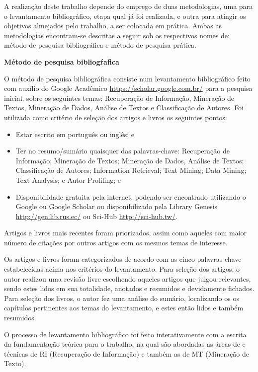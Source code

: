 A realização deste trabalho depende do emprego de duas metodologias, uma para o levantamento bibliográfico, etapa qual já foi realizada, e outra para atingir os objetivos almejados pelo trabalho, a ser colocada em prática.
Ambas as metodologias encontram-se descritas a seguir sob os respectivos nomes de: método de pesquisa bibliográfica e método de pesquisa prática.

\textbf{Método de pesquisa bibliogŕafica}

O método de pesquisa bibliográfica consiste num levantamento bibliográfico feito com auxílio do Google Acadêmico \url{https://scholar.google.com.br/} para a pesquisa inicial, sobre os seguintes temas: Recuperação de Informação, Mineração de Textos, Mineração de Dados, Análise de Textos e Classificação de Autores.
Foi utilizada como critério de seleção dos artigos e livros os seguintes pontos:
\begin{itemize}
    \item Estar escrito em português ou inglês; e
    \item Ter no resumo/sumário quaisquer das palavras-chave: Recuperação de Informação; Mineração de Textos; Mineração de Dados, Análise de Textos; Classificação de Autores; Information Retrieval; Text Mining; Data Mining; Text Analysis; e Autor Profiling; e
    \item Disponibilidade gratuita pela internet, podendo ser encontrado utilizando o Google ou Google Scholar ou disponibilizado pela Library Genesis \url{http://gen.lib.rus.ec/} ou Sci-Hub \url{http://sci-hub.tw/}.
\end{itemize}
Artigos e livros mais recentes foram priorizados, assim como aqueles com maior número de citações por outros artigos com os mesmos temas de interesse.

Os artigos e livros foram categorizados de acordo com as cinco palavras chave estabelecidas acima nos critérios do levantamento.
Para seleção dos artigos, o autor realizou uma revisão livre escolhendo aqueles artigos que julgou relevantes, sendo estes lidos em sua totalidade, anotados e resumidos e devidamente fichados. 
Para seleção dos livros, o autor fez uma análise do sumário, localizando os os capítulos pertinentes aos temas do levantamento, e estes então lidos e também resumidos.

O processo de levantamento bibliográfico foi feito interativamente com a escrita da fundamentação teórica para o  trabalho, na qual são abordadas as áreas de e técnicas de RI (Recuperação de Informação) e também as de MT (Mineração de Texto).

